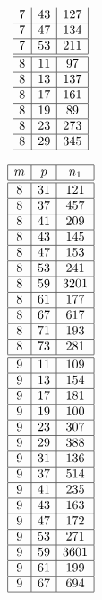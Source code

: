 \documentclass[a4paper, 10pt]{article}
\begin{document}
\begin{center}
\begin{minipage}[t]{.23\textwidth}
\begin{displaymath}
\begin{array}{|c|c|c|}
7 & 43 & 127 \\ \hline
7 & 47 & 134 \\ \hline
7 & 53 & 211 \\ \hline
\hline
8 & 11 & 97 \\ \hline
8 & 13 & 137 \\ \hline
8 & 17 & 161 \\ \hline
8 & 19 & 89 \\ \hline
8 & 23 & 273 \\ \hline
8 & 29 & 345 \\ \hline
\end{array}
\end{displaymath}
\end{minipage}
\begin{minipage}[t]{.23\textwidth}
\begin{displaymath}
\begin{array}{|c|c|c|}
\hline
m & p & n_{1} \\ \hline
\hline
8 & 31 & 121 \\ \hline
8 & 37 & 457 \\ \hline
8 & 41 & 209 \\ \hline
8 & 43 & 145 \\ \hline
8 & 47 & 153 \\ \hline
8 & 53 & 241 \\ \hline
8 & 59 & 3201 \\ \hline
8 & 61 & 177 \\ \hline
8 & 67 & 617 \\ \hline
8 & 71 & 193 \\ \hline
8 & 73 & 281 \\ \hline
\hline
9 & 11 & 109 \\ \hline
9 & 13 & 154 \\ \hline
9 & 17 & 181 \\ \hline
9 & 19 & 100 \\ \hline
9 & 23 & 307 \\ \hline
9 & 29 & 388 \\ \hline
9 & 31 & 136 \\ \hline
9 & 37 & 514 \\ \hline
9 & 41 & 235 \\ \hline
9 & 43 & 163 \\ \hline
9 & 47 & 172 \\ \hline
9 & 53 & 271 \\ \hline
9 & 59 & 3601 \\ \hline
9 & 61 & 199 \\ \hline
9 & 67 & 694 \\ \hline

\end{array}
\end{displaymath}
\end{minipage}
\end{center}
\end{document}
